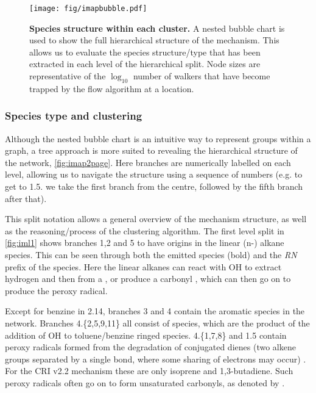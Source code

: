 \begin{figure}[H]
  \centering
  \texttt{[image: fig/imapbubble.pdf]}
  \caption{\textbf{Species structure within each cluster.} A nested bubble chart is used to show the full hierarchical structure of the mechanism. This allows us to evaluate the species structure/type that has been extracted in each level of the hierarchical split. Node sizes are representative of the $\log_{10}$ number of walkers that have become trapped by the flow algorithm at a location. }
    \label{fig:imbubble}
\end{figure}




\subsubsection{Species type and clustering}
Although the nested bubble chart is an intuitive way to represent groups within a graph, a tree approach is more suited to revealing the hierarchical structure of the network, \autoref{fig:imap2page}. Here branches are numerically labelled on each level, allowing us to navigate the structure using a sequence of numbers (e.g. to get to 1.5. we take the first branch from the centre, followed by the fifth branch after that).

This split notation allows a general overview of the mechanism structure, as well as the reasoning/process of the clustering algorithm. The first level split in \autoref{fig:iml1} shows branches 1,2 and 5 to have origins in the linear (n-) alkane species. This can be seen through both the emitted species (bold) and the \emph{RN} prefix of the species. Here the linear alkanes can react with OH to extract hydrogen and then from a , or produce a carbonyl \emph{}, which can then go on to produce the \emph{} peroxy radical.

Except for benzine in 2.14, branches 3 and 4 contain the aromatic species in the network.  Branches 4.\{2,5,9,11\} all consist of \emph{} species, which are the product of the addition of OH to toluene/benzine ringed species. 4.\{1,7,8\} and 1.5 contain peroxy radicals formed from the degradation of conjugated dienes (two alkene groups separated by a single bond, where some sharing of electrons may occur) \emph{}. For the CRI v2.2 mechanism these are only isoprene and 1,3-butadiene. Such peroxy radicals often go on to form unsaturated carbonyls, as denoted by \emph{}.

